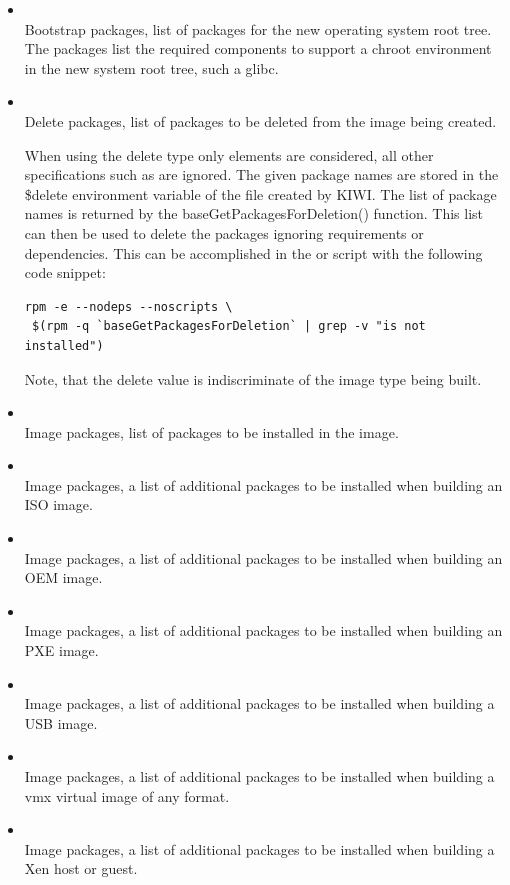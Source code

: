 \begin{itemize}
\item {}\\
      Bootstrap packages, list of packages for the new operating system
      root tree. The packages list the required components to support a 
      chroot environment in the new system root tree, such a glibc.
\item {}\\
      Delete packages, list of packages to be deleted from the image being
      created.

      When using the delete type only  elements are considered, all
      other specifications such as  are ignored. The given
      package names are stored in the \$delete environment variable of the 
       file created by KIWI. The list of package names is returned 
      by the baseGetPackagesForDeletion() function. This list can then be
      used to delete the packages ignoring requirements or dependencies. 
      This can be accomplished in the  or  script with
      the following code snippet:
\begin{verbatim}
rpm -e --nodeps --noscripts \
 $(rpm -q `baseGetPackagesForDeletion` | grep -v "is not installed")
\end{verbatim}
      Note, that the delete value is indiscriminate of the image type
      being built.
\item {}\\
      Image packages, list of packages to be installed in the image.
\item \xmlval{iso}\\
      Image packages, a list of additional packages to be installed 
      when building an ISO image.
\item {}\\
      Image packages, a list of additional packages to be installed 
      when building an OEM image.
\item {}\\
      Image packages, a list of additional packages to be installed 
      when building an PXE image.
\item {}\\
      Image packages, a list of additional packages to be installed 
      when building a USB image.
\item {}\\
      Image packages, a list of additional packages to be installed 
      when building a vmx virtual image of any format.
\item {}\\
      Image packages, a list of additional packages to be installed 
      when building a Xen host or guest.
\end{itemize}

